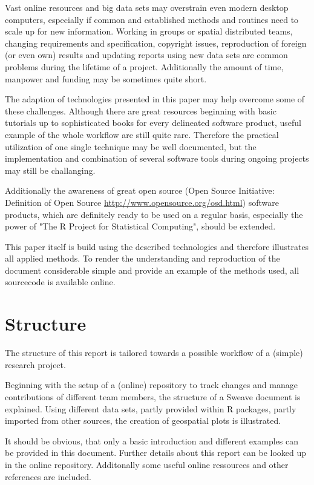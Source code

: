 \documentclass{ifacconf}
\begin{document}
Vast online resources and big data sets may overstrain
even modern desktop computers, especially if common and established methods
and routines need to scale up for new information. 
Working in groups or spatial distributed teams,  
changing requirements and specification, copyright issues, reproduction of 
foreign (or even own) results  and updating reports using new data sets are common 
problems during the lifetime of a project. 
Additionally the amount of time, manpower and funding 
may be sometimes quite short.

The adaption of technologies presented in this paper may help overcome
some of these challenges. Although there are great resources beginning with 
basic tutorials up to sophisticated books for every delineated software product,
useful example of the whole workflow are still quite rare. Therefore the 
practical utilization of one single technique may be well documented, but
the implementation and combination of several software tools during ongoing
projects may still be challanging.

Additionally the awareness of great open source
(Open Source Initiative: Definition of Open Source \url{http://www.opensource.org/osd.html}) 
software products, which are 
definitely ready to be used on a regular basis, especially the power of "The R Project
for Statistical Computing", should be extended.

This paper itself is build using the described technologies and therefore illustrates 
all applied methods. To render the understanding and reproduction of the document 
considerable simple and provide an example of the methods used, all sourcecode is
available online.

\section{Structure}
The structure of this report is tailored towards a possible workflow of a (simple)
research project. 

Beginning with the setup of a (online) repository to track changes and manage 
contributions of different team members, the structure of a Sweave document is
explained. Using different data sets, partly provided within R packages, partly
imported from other sources, the creation of geospatial plots is illustrated. 

It should be obvious, that only a basic introduction and different examples 
can be provided in this document. Further details about this report can be
looked up in the online repository. Additonally some useful online ressources
and other references are included.
\end{document}
